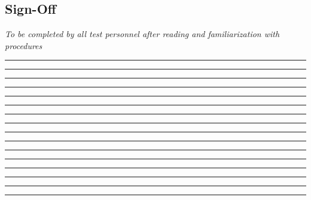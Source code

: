 \subsection{Sign-Off}
\textit{To be completed by all test personnel after reading and familiarization with procedures}
\begin{checklist}
    \item \opsfull      \tabto{25em}\rule{10em}{0.4pt}\hspace{5em}\rule{10em}{0.4pt}
    \item \primaryfull  \tabto{25em}\rule{10em}{0.4pt}\hspace{5em}\rule{10em}{0.4pt}
    \item \secondaryfull\tabto{25em}\rule{10em}{0.4pt}\hspace{5em}\rule{10em}{0.4pt}
    \item \daqfull      \tabto{25em}\rule{10em}{0.4pt}\hspace{5em}\rule{10em}{0.4pt}
    \item \perifull     \tabto{25em}\rule{10em}{0.4pt}\hspace{5em}\rule{10em}{0.4pt}
    \item \periifull    \tabto{25em}\rule{10em}{0.4pt}\hspace{5em}\rule{10em}{0.4pt}
    \item \periiifull   \tabto{25em}\rule{10em}{0.4pt}\hspace{5em}\rule{10em}{0.4pt}
    \item \controlfull  \tabto{25em}\rule{10em}{0.4pt}\hspace{5em}\rule{10em}{0.4pt}
\end{checklist}
\setcounter{checklistnum}{0}

\newpage

